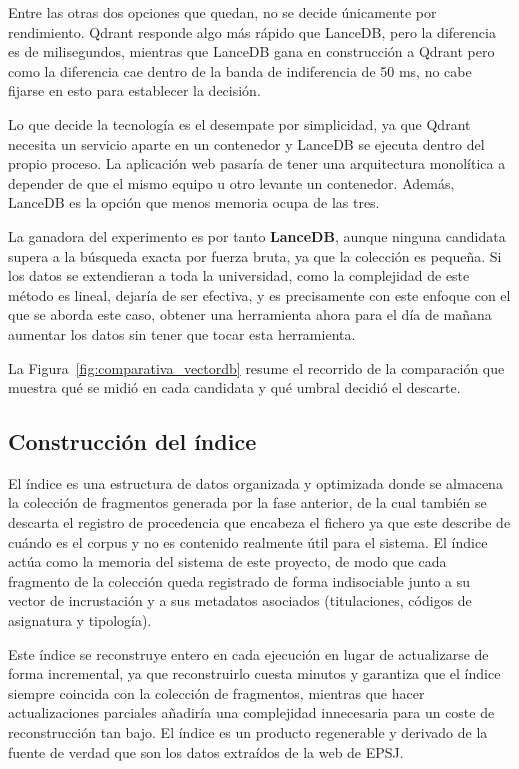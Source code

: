 Entre las otras dos opciones que quedan, no se decide únicamente por rendimiento. Qdrant responde algo más rápido que LanceDB, pero la diferencia es de milisegundos, mientras que LanceDB gana en construcción a Qdrant pero como la diferencia cae dentro de la banda de indiferencia de 50 ms, no cabe fijarse en esto para establecer la decisión.

Lo que decide la tecnología es el desempate por simplicidad, ya que Qdrant necesita un servicio aparte en un contenedor y LanceDB se ejecuta dentro del propio proceso. La aplicación web pasaría de tener una arquitectura monolítica a depender de que el mismo equipo u otro levante un contenedor. Además, LanceDB es la opción que menos memoria ocupa de las tres.

La ganadora del experimento es por tanto \textbf{LanceDB}, aunque ninguna candidata supera a la búsqueda exacta por fuerza bruta, ya que la colección es pequeña. Si los datos se extendieran a toda la universidad, como la complejidad de este método es lineal, dejaría de ser efectiva, y es precisamente con este enfoque con el que se aborda este caso, obtener una herramienta ahora para el día de mañana aumentar los datos sin tener que tocar esta herramienta.

La Figura~\ref{fig:comparativa_vectordb} resume el recorrido de la comparación que muestra qué se midió en cada candidata y qué umbral decidió el descarte.



\subsection[Construcción del índice]{Construcción del índice}
\label{secc:fase2_construccion_indice}

El índice es una estructura de datos organizada y optimizada donde se almacena la colección de fragmentos generada por la fase anterior, de la cual también se descarta el registro de procedencia que encabeza el fichero ya que este describe de cuándo es el corpus y no es contenido realmente útil para el sistema. El índice actúa como la memoria del sistema de este proyecto, de modo que cada fragmento de la colección queda registrado de forma indisociable junto a su vector de incrustación y a sus metadatos asociados (titulaciones, códigos de asignatura y tipología). 

Este índice se reconstruye entero en cada ejecución en lugar de actualizarse de forma incremental, ya que reconstruirlo cuesta minutos y garantiza que el índice siempre coincida con la colección de fragmentos, mientras que hacer actualizaciones parciales añadiría una complejidad innecesaria para un coste de reconstrucción tan bajo. El índice es un producto regenerable y derivado de la fuente de verdad que son los datos extraídos de la web de EPSJ.

